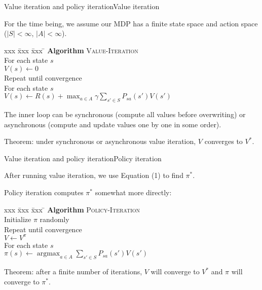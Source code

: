 \documentclass{beamer}
\DeclareMathOperator*{\argmax}{argmax}
\begin{document}
\begin{frame}{Value iteration and policy iteration}{Value iteration}

  For the time being, we assume our MDP has a finite state space and
  action space ($|S| < \infty$, $|A| < \infty$).

  \begin{tabbing}
    xxx \= xxx \= xxx \= \kill
    \textbf{Algorithm} \textsc{Value-Iteration} \\
    \> For each state $s$ \\
    \> \> $V(s) \leftarrow 0$ \\
    \> Repeat until convergence \\
    \> \> For each state $s$ \\
    \> \> \>
       $V(s) \leftarrow R(s) + \max_{a\in A} \gamma \sum_{s'\in S} P_{sa}(s')V(s')$
  \end{tabbing}

  \medskip

  The inner loop can be \alert{synchronous} (compute all values
  before overwriting) or \alert{asynchronous} (compute and update values
  one by one in some order).

  \medskip

  Theorem: \alert{under synchronous or asynchronous value iteration, $V$ converges to $V^*$}.
    
\end{frame}


\begin{frame}{Value iteration and policy iteration}{Policy iteration}

  After running value iteration, we use Equation (1) to find $\pi^*$.

  \medskip

  \alert{Policy iteration} computes $\pi^*$ somewhat more directly:
  \begin{tabbing}
    xxx \= xxx \= xxx \= \kill
    \textbf{Algorithm} \textsc{Policy-Iteration} \\
    \> Initialize $\pi$ randomly \\
    \> Repeat until convergence \\
    \> \> $V \leftarrow V^\pi$ \\
    \> \> For each state $s$ \\
    \> \> \> $\pi(s) \leftarrow \argmax_{a\in A}\sum_{s'\in S}P_{sa}(s')V(s')$
  \end{tabbing}

  \medskip

  Theorem: after a finite number of iterations, \alert{$V$ will converge to
  $V^*$ and $\pi$ will converge to $\pi^*$}.
  
\end{frame}
\end{document}
